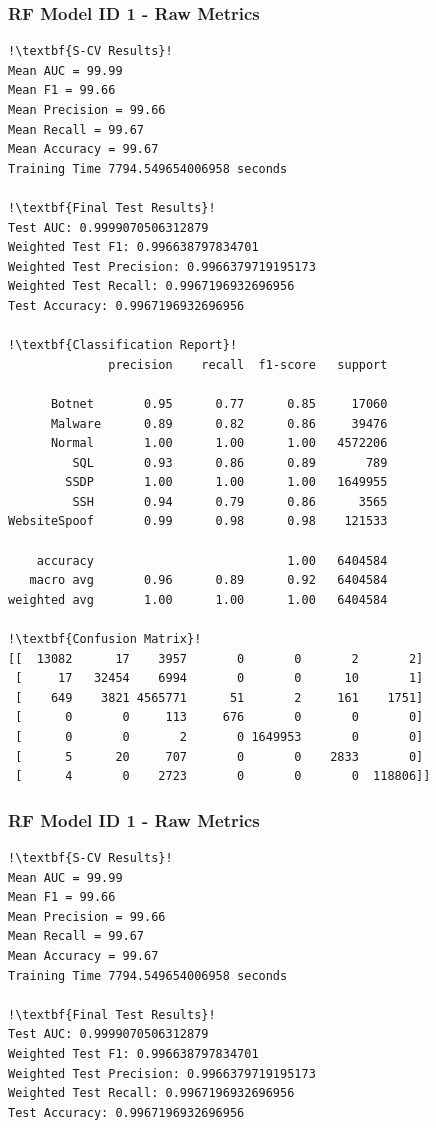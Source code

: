\begin{appendices}
\newpage
\subsubsection{RF Model ID 1 - Raw Metrics}
\begin{lstlisting}[escapechar=!]
!\textbf{S-CV Results}!
Mean AUC = 99.99
Mean F1 = 99.66
Mean Precision = 99.66
Mean Recall = 99.67
Mean Accuracy = 99.67
Training Time 7794.549654006958 seconds

!\textbf{Final Test Results}!
Test AUC: 0.9999070506312879
Weighted Test F1: 0.996638797834701
Weighted Test Precision: 0.9966379719195173
Weighted Test Recall: 0.9967196932696956
Test Accuracy: 0.9967196932696956

!\textbf{Classification Report}!
			  precision    recall  f1-score   support

      Botnet       0.95      0.77      0.85     17060
      Malware      0.89      0.82      0.86     39476
      Normal       1.00      1.00      1.00   4572206
         SQL       0.93      0.86      0.89       789
        SSDP       1.00      1.00      1.00   1649955
         SSH       0.94      0.79      0.86      3565
WebsiteSpoof       0.99      0.98      0.98    121533

    accuracy                           1.00   6404584
   macro avg       0.96      0.89      0.92   6404584
weighted avg       1.00      1.00      1.00   6404584
    
!\textbf{Confusion Matrix}!    
[[  13082      17    3957       0       0       2       2]
 [     17   32454    6994       0       0      10       1]
 [    649    3821 4565771      51       2     161    1751]
 [      0       0     113     676       0       0       0]
 [      0       0       2       0 1649953       0       0]
 [      5      20     707       0       0    2833       0]
 [      4       0    2723       0       0       0  118806]]
\end{lstlisting}


\newpage
\subsubsection{RF Model ID 1 - Raw Metrics}
\begin{lstlisting}[escapechar=!]
!\textbf{S-CV Results}!
Mean AUC = 99.99
Mean F1 = 99.66
Mean Precision = 99.66
Mean Recall = 99.67
Mean Accuracy = 99.67
Training Time 7794.549654006958 seconds

!\textbf{Final Test Results}!
Test AUC: 0.9999070506312879
Weighted Test F1: 0.996638797834701
Weighted Test Precision: 0.9966379719195173
Weighted Test Recall: 0.9967196932696956
Test Accuracy: 0.9967196932696956


\end{lstlisting}
\end{appendices}
